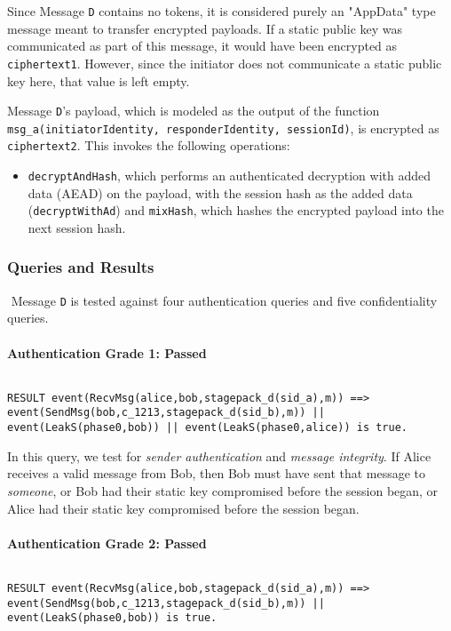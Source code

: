 Since Message \texttt{D} contains no tokens, it is considered purely an "AppData" type message meant to transfer encrypted payloads.
If a static public key was communicated as part of this message, it would have been encrypted as \texttt{ciphertext1}. However, since the initiator does not communicate a static public key here, that value is left empty.


Message \texttt{D}'s payload, which is modeled as the output of the function \texttt{msg\_a(initiatorIdentity, responderIdentity, sessionId)}, is encrypted as \texttt{ciphertext2}. This invokes the following operations:


\begin{itemize}

\item \texttt{decryptAndHash}, which performs an authenticated decryption with added data (AEAD) on the payload, with the session hash as the added data (\texttt{decryptWithAd}) and \texttt{mixHash}, which hashes the encrypted payload into the next session hash.

\end{itemize}
\subsubsection{Queries and Results}$ $
Message \texttt{D} is tested against four authentication queries and five confidentiality queries.
\paragraph{Authentication Grade 1: Passed}$ $
\begin{lstlisting}
RESULT event(RecvMsg(alice,bob,stagepack_d(sid_a),m)) ==> event(SendMsg(bob,c_1213,stagepack_d(sid_b),m)) || event(LeakS(phase0,bob)) || event(LeakS(phase0,alice)) is true.
\end{lstlisting}

In this query, we test for \emph{sender authentication} and \emph{message integrity}. If Alice receives a valid message from Bob, then Bob must have sent that message to \emph{someone}, or Bob had their static key compromised before the session began, or Alice had their static key compromised before the session began.


\paragraph{Authentication Grade 2: Passed}$ $
\begin{lstlisting}
RESULT event(RecvMsg(alice,bob,stagepack_d(sid_a),m)) ==> event(SendMsg(bob,c_1213,stagepack_d(sid_b),m)) || event(LeakS(phase0,bob)) is true.
\end{lstlisting}


